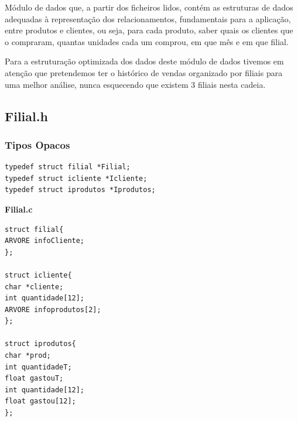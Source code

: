 Módulo de dados que, a partir dos ficheiros lidos, contém as estruturas de dados adequadas à representação dos relacionamentos, fundamentais para a aplicação, entre produtos e clientes, ou seja, para cada produto, saber quais os clientes que o compraram, quantas unidades cada um comprou, em que mês e em que filial.

 Para a estruturação optimizada dos dados deste módulo de dados tivemos em atenção que pretendemos ter o histórico de vendas organizado por filiais para uma melhor análise, nunca esquecendo que existem 3 filiais nesta cadeia. 

\subsection{Filial.h}

\subsubsection{Tipos Opacos}
\begin{Verbatim}
typedef struct filial *Filial;
typedef struct icliente *Icliente;
typedef struct iprodutos *Iprodutos;
\end{Verbatim}

\textbf{Filial.c}
\begin{verbatim}
struct filial{
ARVORE infoCliente;
};

struct icliente{
char *cliente;
int quantidade[12];
ARVORE infoprodutos[2];
};

struct iprodutos{
char *prod;
int quantidadeT;
float gastouT;
int quantidade[12];
float gastou[12];
};
\end{verbatim}

\subsubsection{}

